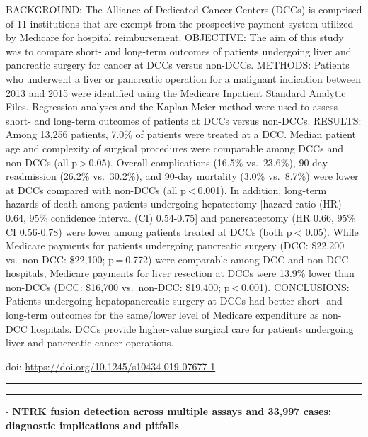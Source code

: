 \documentclass[]{article}
\begin{document}
BACKGROUND: The Alliance of Dedicated Cancer Centers (DCCs) is comprised
of 11 institutions that are exempt from the prospective payment system
utilized by Medicare for hospital reimbursement. OBJECTIVE: The aim of
this study was to compare short- and long-term outcomes of patients
undergoing liver and pancreatic surgery for cancer at DCCs versus
non-DCCs. METHODS: Patients who underwent a liver or pancreatic
operation for a malignant indication between 2013 and 2015 were
identified using the Medicare Inpatient Standard Analytic Files.
Regression analyses and the Kaplan-Meier method were used to assess
short- and long-term outcomes of patients at DCCs versus non-DCCs.
RESULTS: Among 13,256 patients, 7.0\% of patients were treated at a DCC.
Median patient age and complexity of surgical procedures were comparable
among DCCs and non-DCCs (all p \textgreater{} 0.05). Overall
complications (16.5\% vs.~23.6\%), 90-day readmission (26.2\%
vs.~30.2\%), and 90-day mortality (3.0\% vs.~8.7\%) were lower at DCCs
compared with non-DCCs (all p \textless{} 0.001). In addition, long-term
hazards of death among patients undergoing hepatectomy {[}hazard ratio
(HR) 0.64, 95\% confidence interval (CI) 0.54-0.75{]} and pancreatectomy
(HR 0.66, 95\% CI 0.56-0.78) were lower among patients treated at DCCs
(both p \textless{}  0.05). While Medicare payments for patients
undergoing pancreatic surgery (DCC: \$22,200 vs.~non-DCC: \$22,100;
p = 0.772) were comparable among DCC and non-DCC hospitals, Medicare
payments for liver resection at DCCs were 13.9\% lower than non-DCCs
(DCC: \$16,700 vs.~non-DCC: \$19,400; p \textless{} 0.001). CONCLUSIONS:
Patients undergoing hepatopancreatic surgery at DCCs had better short-
and long-term outcomes for the same/lower level of Medicare expenditure
as non-DCC hospitals. DCCs provide higher-value surgical care for
patients undergoing liver and pancreatic cancer operations.

doi: \url{https://doi.org/10.1245/s10434-019-07677-1}

{}

{}

\begin{center}\rule{0.5\linewidth}{\linethickness}\end{center}

\begin{center}\rule{0.5\linewidth}{\linethickness}\end{center}

 - \textbf{NTRK fusion detection across multiple assays and 33,997
cases: diagnostic implications and pitfalls}
\end{document}
